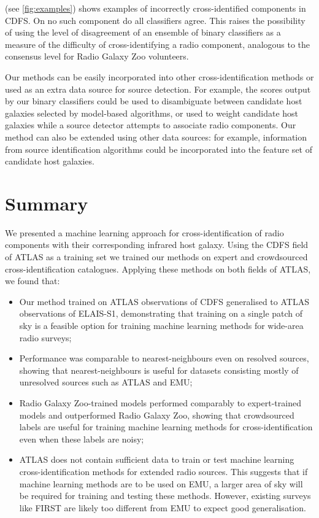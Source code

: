   { (see \autoref{fig:examples}) shows examples of incorrectly cross-identified
  components in CDFS. On no such component do all classifiers agree.
  This raises the possibility of using the level of disagreement of an
  ensemble of binary classifiers as a measure of the difficulty of cross-identifying a radio component,
  analogous to the consensus level for Radio Galaxy Zoo volunteers.}

  Our methods can be easily incorporated into other cross-identification
  methods or used as an extra data source for source detection. For
  example, the scores output by our binary classifiers could be used to
  disambiguate between candidate host
  galaxies selected by model-based algorithms, or used to weight candidate
  host galaxies while a source detector attempts to associate radio
  components. Our method can also be extended using other data sources: for
  example, information from source identification algorithms could be
  incorporated into the feature set of candidate host galaxies.

\section{Summary}

  We presented a machine learning approach for cross-identification of radio
  components with their corresponding infrared host galaxy. Using the CDFS
  field of ATLAS as a training set we trained our
  methods on expert and crowdsourced cross-identification catalogues.
  Applying these methods on both fields of ATLAS, we found that:
  \begin{itemize}
    \item Our method trained on ATLAS observations of CDFS generalised to
    ATLAS observations of ELAIS-S1, demonstrating that training on a single
    patch of sky is a feasible option for training machine learning methods
    for wide-area radio surveys;
    \item Performance was comparable to nearest-neighbours even on resolved
    sources, showing that nearest-neighbours is useful for datasets consisting
    mostly of unresolved sources such as ATLAS and EMU;
    \item Radio Galaxy Zoo-trained models performed comparably to
    expert-trained models and outperformed Radio Galaxy Zoo, showing that
    crowdsourced labels are useful for training machine learning methods for
    cross-identification even when these labels are noisy;
    \item ATLAS does not contain sufficient data to train or test machine
    learning cross-identification methods for extended radio sources. This
    suggests that if machine learning methods are to be used on EMU, a larger
    area of sky will be required for training and testing these methods.
    However, existing surveys like FIRST are likely too different from EMU to expect
    good generalisation.
  \end{itemize}

